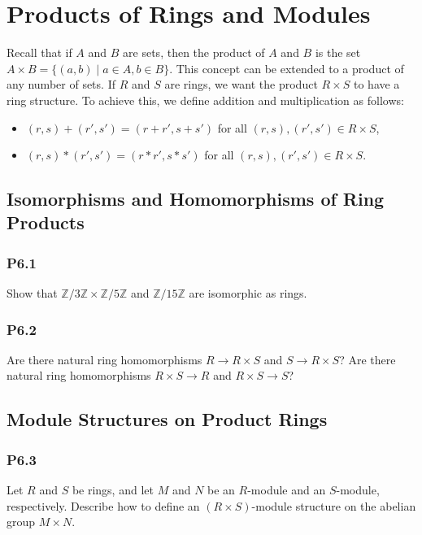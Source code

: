 \documentclass[lang=cn,11pt]{template}
\begin{document}
\chapter{Products of Rings and Modules}

\begin{definition}
Recall that if \( A \) and \( B \) are sets, then the product of \( A \) and \( B \) is the set \( A \times B = \{ (a, b) \mid a \in A, b \in B \} \). This concept can be extended to a product of any number of sets. If \( R \) and \( S \) are rings, we want the product \( R \times S \) to have a ring structure. To achieve this, we define addition and multiplication as follows:
\begin{itemize}
    \item \( (r, s) + (r', s') = (r + r', s + s') \) for all \( (r, s), (r', s') \in R \times S \),
    \item \( (r, s) * (r', s') = (r * r', s * s') \) for all \( (r, s), (r', s') \in R \times S \).
\end{itemize}
\end{definition}

\section{Isomorphisms and Homomorphisms of Ring Products}

\subsection*{P6.1} Show that \( \mathbb{Z}/3\mathbb{Z} \times \mathbb{Z}/5\mathbb{Z} \) and \( \mathbb{Z}/15\mathbb{Z} \) are isomorphic as rings.

\subsection*{P6.2} Are there natural ring homomorphisms \( R \to R \times S \) and \( S \to R \times S \)? Are there natural ring homomorphisms \( R \times S \to R \) and \( R \times S \to S \)?

\section{Module Structures on Product Rings}

\subsection*{P6.3} Let \( R \) and \( S \) be rings, and let \( M \) and \( N \) be an \( R \)-module and an \( S \)-module, respectively. Describe how to define an \( (R \times S) \)-module structure on the abelian group \( M \times N \).
\end{document}
